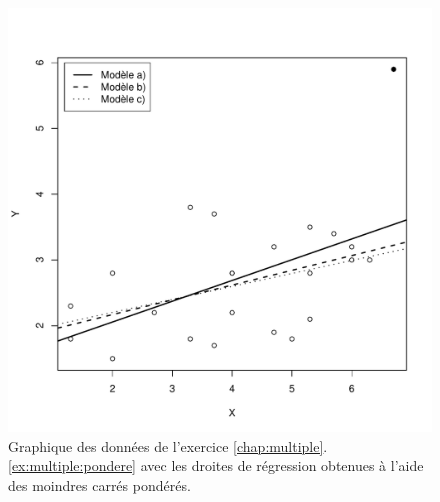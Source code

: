 \begin{solution}{3.17}
\begin{enumerate}
\begin{figure}[t]
\begin{knitrout}
\includegraphics[width=\maxwidth]{figure/unnamed-chunk-47-1}

\end{knitrout}
        \caption{Graphique des données de l'exercice
          \ref{chap:multiple}.\ref{ex:multiple:pondere} avec les
          droites de régression obtenues à l'aide des moindres carrés
          pondérés.}
        \label{fig:multiple:pondere2}
      \end{figure}
    \end{enumerate}
  
\end{solution}
